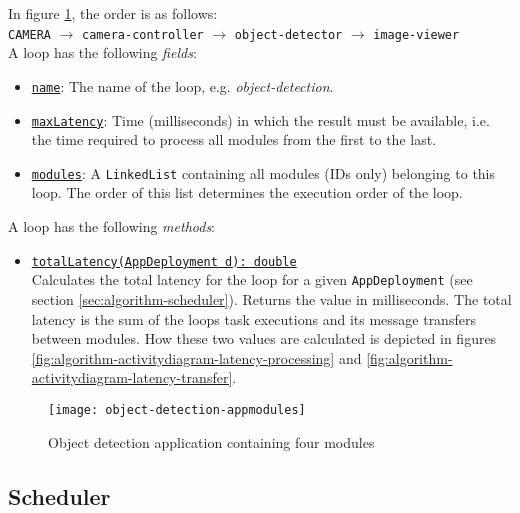 \begin{itemize}
   In figure \ref{fig:object-detection-appmodules}, the order is as follows:\\
    \texttt{CAMERA} $\rightarrow$ \texttt{camera-controller} $\rightarrow$ \texttt{object-detector} $\rightarrow$ \texttt{image-viewer}\\[0.5ex]
   A loop has the following \textit{fields}:
   \begin{itemize}
       \item \underline{\texttt{name}}: The name of the loop, e.g. \textit{object-detection}.
       \item \underline{\texttt{maxLatency}}: Time (milliseconds) in which the result must be available, i.e. the time required to process all modules from the first to the last.
       \item \underline{\texttt{modules}}: A \texttt{LinkedList} containing all modules (IDs only) belonging to this loop. The order of this list determines the execution order of the loop.
   \end{itemize}
   A loop has the following \textit{methods}:
   \begin{itemize}
       \item \underline{\texttt{totalLatency(AppDeployment d): double}}\\
       Calculates the total latency for the loop for a given \texttt{AppDeployment} (see section \ref{sec:algorithm-scheduler}). Returns the value in milliseconds. The total latency is the sum of the loops task executions and its message transfers between modules. How these two values are calculated is depicted in figures \ref{fig:algorithm-activitydiagram-latency-processing} and \ref{fig:algorithm-activitydiagram-latency-transfer}.
   \end{itemize}
\end{itemize}

\begin{figure}[htbp]
    \centering
    \texttt{[image: object-detection-appmodules]}
    \caption{Object detection application containing four modules}
    \label{fig:object-detection-appmodules}
\end{figure}



\subsection{Scheduler\label{sec:algorithm-scheduler}}

